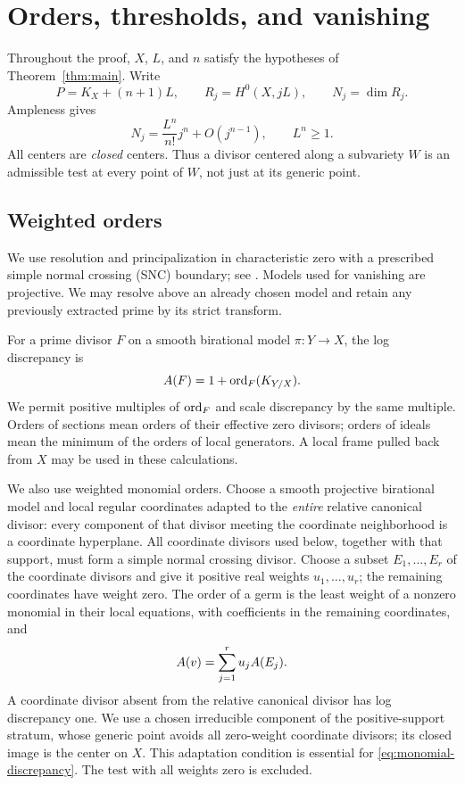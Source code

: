 \section{Orders, thresholds, and vanishing}\label{sec:preliminaries}
Throughout the proof, $X$, $L$, and $n$ satisfy the hypotheses of
Theorem~\ref{thm:main}. Write
\[
 P=K_X+(n+1)L,\qquad R_j=H^0(X,jL),\qquad N_j=\dim R_j.
\]
Ampleness gives
\begin{equation}\label{eq:hilbert-X}
 N_j=\frac{L^n}{n!}j^n+O(j^{n-1}),\qquad L^n\geq1.
\end{equation}
All centers are \emph{closed} centers. Thus a divisor centered along
a subvariety $W$ is an admissible test at every point of $W$, not just
at its generic point.

\subsection{Weighted orders}
We use resolution and principalization in characteristic zero with a
prescribed simple normal crossing (SNC) boundary; see
\cite[Theorems~1.0.1 and~2.4.1]{wlodarczyk2005}.
Models used for vanishing are projective. We may resolve above an
already chosen model and retain any previously extracted prime by its
strict transform.

For a prime divisor $F$ on a smooth birational model $\pi:Y\to X$,
the log discrepancy is
\[
 A(F)=1+\operatorname{ord}_F(K_{Y/X}).
\]
We permit positive multiples of $\operatorname{ord}_F$ and scale discrepancy by the
same multiple. Orders of sections mean orders of their effective zero
divisors; orders of ideals mean the minimum of the orders of local
generators. A local frame pulled back from $X$ may be used in these
calculations.

We also use weighted monomial orders. Choose a smooth projective
birational model and local regular coordinates adapted to the
\emph{entire} relative canonical divisor: every component of that
divisor meeting the coordinate neighborhood is a coordinate
hyperplane. All coordinate divisors used below, together with that
support, must form a simple normal crossing divisor. Choose a subset
$E_1,\ldots,E_r$ of the coordinate divisors and give it positive real
weights $u_1,\ldots,u_r$; the remaining coordinates have weight zero.
The order of a germ is the least weight of a nonzero
monomial in their local equations, with coefficients in the remaining
coordinates, and
\begin{equation}\label{eq:monomial-discrepancy}
             A(v)=\sum_{j=1}^r u_jA(E_j).
\end{equation}
A coordinate divisor absent from the relative canonical divisor has
log discrepancy one. We use a chosen irreducible component of the
positive-support stratum, whose generic point avoids all zero-weight
coordinate divisors; its closed image is the center on $X$. This
adaptation condition is essential for
\eqref{eq:monomial-discrepancy}. The test with all weights zero is
excluded.

